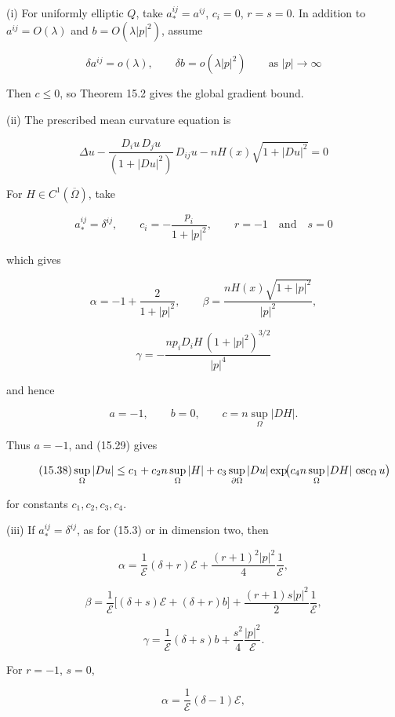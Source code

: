 (i) For uniformly elliptic \(Q\), take \(a_*^{ij}=a^{ij}\), \(c_i=0\),
\(r=s=0\). In addition to \(a^{ij}=O(\lambda)\) and
\(b=O(\lambda|p|^2)\), assume

\begin{equation}
\tag{15.36}
\delta a^{ij}=o(\lambda), \qquad \delta b=o(\lambda|p|^2) \qquad \text{as } |p|\to\infty
\end{equation}

Then \(c\le0\), so Theorem 15.2 gives the global gradient bound.

(ii) The prescribed mean curvature equation is

\begin{equation}
\tag{15.37}
\Delta u-\frac{D_i u\, D_j u}{(1+|Du|^2)}\,D_{ij}u-nH(x)\sqrt{1+|Du|^2}=0
\end{equation}


For \(H\in C^1(\overline\Omega)\), take

\[
a_{*}^{ij}=\delta^{ij}, \qquad c_i=-\frac{p_i}{1+|p|^{2}}, \qquad r=-1 \quad \text{and} \quad s=0
\]

which gives

\[
\alpha=-1+\frac{2}{1+|p|^{2}}, \qquad \beta=\frac{n H(x)\sqrt{1+|p|^{2}}}{|p|^{2}},
\]

\[
\gamma=-\frac{n p_i D_i H \, (1+|p|^{2})^{3/2}}{|p|^{4}}
\]

and hence

\[
a=-1, \qquad b=0, \qquad c=n \sup_{\Omega} |DH|.
\]

Thus \(a=-1\), and (15.29) gives

\[
\tag{15.38}
\sup_{\Omega} |Du| \le c_1 + c_2 n \sup_{\Omega} |H| + c_3 \sup_{\partial\Omega} |Du| \exp\!\bigl(c_4 n \sup_{\Omega} |DH| \, \operatorname{osc}_{\Omega} u\bigr)
\]

for constants \(c_1,c_2,c_3,c_4\).

(iii) If \(a_*^{ij}=\delta^{ij}\), as for (15.3) or in dimension two, then

\[
\alpha=\frac{1}{\mathscr{E}}(\delta+r)\mathscr{E}+\frac{(r+1)^{2}|p|^{2}}{4}\frac{1}{\mathscr{E}},
\]

\[
\tag{15.39}
\beta=\frac{1}{\mathscr{E}}\bigl[(\delta+s)\mathscr{E}+(\delta+r)b\bigr]+\frac{(r+1)s|p|^{2}}{2}\frac{1}{\mathscr{E}},
\]

\[
\gamma=\frac{1}{\mathscr{E}}(\delta+s)b+\frac{s^{2}}{4}\frac{|p|^{2}}{\mathscr{E}}.
\]

For \(r=-1\), \(s=0\),

\[
\alpha=\frac{1}{\mathscr{E}}(\delta-1)\mathscr{E},
\]

